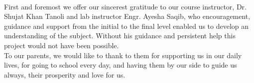 


\begin{titlepage}
\begin{center}
 \\
\end{center}
  \vspace*{0.5cm}

\noindent First and foremost we offer our sincerest gratitude to our course instructor,  Dr. Shujat Khan Tanoli and lab instructor Engr. Ayesha Saqib, who encouragement, guidance and support from the initial to the final level enabled us to develop an understanding of the subject. Without his guidance and persistent help this project would not have been possible.\\[0.2cm]
To our parents, we would like to thank to them for supporting us in our daily lives, for going to school every day, and having them by our side to guide us always, their prosperity and love for us.
\end{titlepage}


